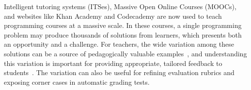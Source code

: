 Intelligent tutoring systems (ITSes), Massive Open Online Courses (MOOCs), and websites like Khan Academy and Codecademy are now used to teach programming courses at a massive scale. In these courses, a single programming problem may produce thousands of solutions from learners, which presents both an opportunity and a challenge. For teachers, the wide variation among these solutions can be a source of pedagogically valuable examples~\cite{marton13}, and understanding this variation is important for providing appropriate, tailored feedback to students~\cite{basupowergrading,MOOCshop}. The variation can also be useful for refining evaluation rubrics and exposing corner cases in automatic grading tests.

